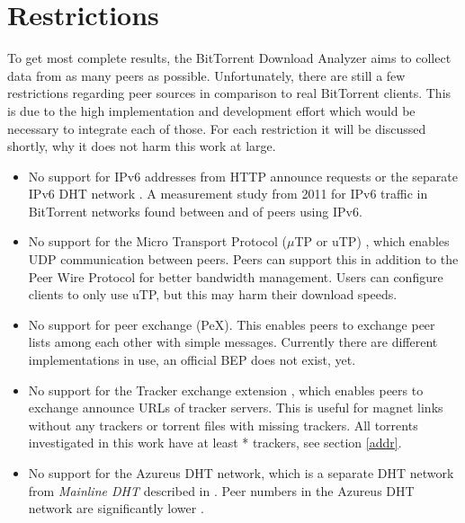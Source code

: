 \documentclass[10pt, a4paper, twoside, headsepline]{scrbook}
\renewcommand{\_}{\origunderscore\allowbreak}
\begin{document}
\section{Restrictions}
To get most complete results, the BitTorrent Download Analyzer aims to collect data from as many peers as possible. Unfortunately, there are still a few restrictions regarding peer sources in comparison to real BitTorrent clients. This is due to the high implementation and development effort which would be necessary to integrate each of those. For each restriction it will be discussed shortly, why it does not harm this work at large.
\begin{itemize}
\item No support for IPv6 addresses from HTTP announce requests \cite{bep7} or the separate IPv6 DHT network \cite{bep32}. A measurement study \cite[sec.~4.2.]{vyncke2012measuring} from 2011 for IPv6 traffic in BitTorrent networks found between  and  of peers using IPv6.
\item No support for the Micro Transport Protocol ($\mu$TP or uTP) \cite{bep29}, which enables UDP communication between peers. Peers can support this in addition to the Peer Wire Protocol for better bandwidth management. Users can configure clients to only use uTP, but this may harm their download speeds.
\item No support for peer exchange (PeX). This enables peers to exchange peer lists among each other with simple messages. Currently there are different implementations in use, an official BEP does not exist, yet.
\item No support for the Tracker exchange extension \cite{bep28}, which enables peers to exchange announce URLs of tracker servers. This is useful for magnet links without any trackers or torrent files with missing trackers. All torrents investigated in this work have at least * trackers, see section \ref{addr}.
\item No support for the Azureus DHT network, which is a separate DHT network from \emph{Mainline DHT} described in \cite{bep5}. Peer numbers in the Azureus DHT network are significantly lower \cite[table~5]{drachen2011distribution}.
\end{itemize}
\end{document}
